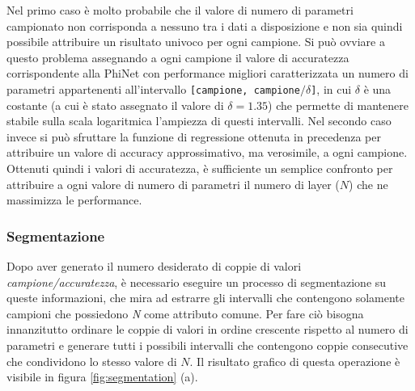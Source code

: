 Nel primo caso è molto probabile che il valore di numero di parametri campionato non corrisponda a nessuno tra i dati a disposizione e non sia quindi possibile attribuire un risultato univoco per ogni campione. Si può ovviare a questo problema assegnando a ogni campione il valore di accuratezza corrispondente alla PhiNet con performance migliori caratterizzata un numero di parametri appartenenti all'intervallo \texttt{[campione, campione$/\delta$]}, in cui $\delta$ è una costante (a cui è stato assegnato il valore di $\delta = 1.35$) che permette di mantenere stabile sulla scala logaritmica l'ampiezza di questi intervalli. 
Nel secondo caso invece si può sfruttare la funzione di regressione ottenuta in precedenza per attribuire un valore di accuracy approssimativo, ma verosimile, a ogni campione. 
Ottenuti quindi i valori di accuratezza, è sufficiente un semplice confronto per attribuire a ogni valore di numero di parametri il numero di layer ($N$) che ne massimizza le performance.

\subsubsection{Segmentazione}
Dopo aver generato il numero desiderato di coppie di valori \textit{campione/accuratezza}, è necessario eseguire un processo di segmentazione su queste informazioni, che mira ad estrarre gli intervalli che contengono solamente campioni che possiedono \textit{N} come attributo comune. Per fare ciò bisogna innanzitutto ordinare le coppie di valori in ordine crescente rispetto al numero di parametri e generare tutti i possibili intervalli che contengono coppie consecutive che condividono lo stesso valore di $N$.
Il risultato grafico di questa operazione è visibile in figura \ref{fig:segmentation} (a).


\iffalse
    SCALETTA
    \begin{itemize}
        \item layers viewpoint
        \item motivo e utilità regressione e segmentazione
        \item tutte regressioni
        \begin{itemize}
            \item exp
            \item log
            \item mean(exp, log)
            \item log w/ exp damping (?)
            \item hyp
            \item hyp+
        \end{itemize}
        \item valutzione con cross validation 
        \item segmentazione perchè 
        \item rimagono 3 parametri (con 3 vincoli flash ram operazioni)
    \end{itemize}
\fi

